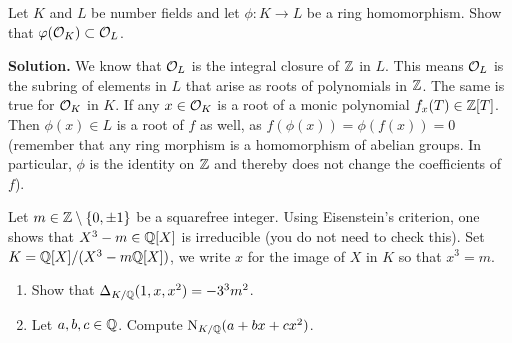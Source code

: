 \documentclass[a4paper,11pt]{article}
\begin{document}
Let $K$ and $L$ be number fields and let $\phi: K \to L$ be a ring homomorphism.
Show that $\varphi(\mathcal{O}_K) \subset \mathcal{O}_L$.

\textbf{Solution.} We know that $\mathcal{O}_L$ is the integral closure of $\mathbb{Z}$ in $L$. This
means $\mathcal{O}_L$ is the subring of elements in $L$ that arise as roots of polynomials
in $\mathbb{Z}$. The same is true for $\mathcal{O}_K$ in $K$. If any $x \in \mathcal{O}_K$ is a root of a
monic polynomial $f_x(T) \in \mathbb{Z}[T]$. Then $\phi(x) \in L$ is a root of $f$ as well,
as $f(\phi(x)) = \phi(f(x)) = 0$ (remember that any ring morphism is a
homomorphism of abelian groups. In particular, $\phi$ is the identity
on $\mathbb{Z}$ and thereby does not change the coefficients of $f$).

Let $m \in \mathbb{Z} \setminus \{0, \pm 1\}$ be a squarefree integer. Using Eisenstein's
criterion, one shows that $X^3 -m \in \mathbb{Q}[X]$ is irreducible (you do not need to check
this). Set $K = \mathbb{Q}[X]/(X^3-m \mathbb{Q}[X])$, we write $x$ for the image of $X$ in $K$
so that $x^3 = m$. 
\begin{enumerate}
    \item Show that $\Delta_{K/\mathbb{Q}}(1,x,x^2) = -3^3 m^2$.
    \item Let $a,b,c \in \mathbb{Q}$. Compute $\operatorname{N}_{K/\mathbb{Q}}(a + bx + cx^2)$.
\end{enumerate}
\end{document}
